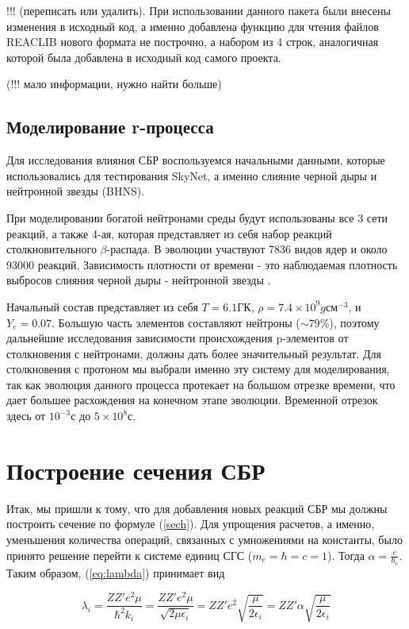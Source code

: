 \documentclass[%
master,    %
natbib,      %
subf,        %
href,        %
colorlinks,  %
]{disser}
\begin{document}
!!! (переписать или удалить). При использовании данного пакета были внесены изменения в исходный код, а именно добавлена функцию для чтения файлов REACLIB нового формата не построчно, а набором из 4 строк, аналогичная которой была добавлена в исходный код самого проекта.

(!!! мало информации, нужно найти больше)

\subsection{Моделирование r-процесса}

Для исследования влияния СБР воспользуемся начальными данными, которые использовались для тестирования SkyNet, а именно слияние черной дыры и нейтронной звезды (BHNS).

При моделировании богатой нейтронами среды будут использованы все 3 сети реакций, а также 4-ая, которая представляет из себя набор реакций столкновительного $\beta$-распада. В эволюции участвуют 7836 видов ядер и около 93000 реакций. Зависимость плотности от времени - это наблюдаемая плотность выбросов слияния черной дыры - нейтронной звезды \cite{bhns}. 

Начальный состав представляет из себя $T = 6.1 \text{ГК}$, $\rho = 7.4 \times 10^9 g \text{см}^{-3}$, и $Y_e = 0.07$. Большую часть элементов составляют нейтроны ($\sim 79 \%$), поэтому дальнейшие исследования зависимости происхождения p-элементов от столкновения с нейтронами, должны дать более значительный результат. Для столкновения с протоном мы выбрали именно эту систему для моделирования, так как эволюция данного процесса протекает на большом отрезке времени, что дает большее расхождения на конечном этапе эволюции. Временной отрезок здесь от $10^{-3}\text{с}$ до $5\times10^8\text{с}$.

\section{Построение сечения СБР}

Итак, мы пришли к тому, что для добавления новых реакций СБР мы должны построить сечение по формуле (\ref{sech}). Для упрощения расчетов, а именно, уменьшения количества операций, связанных с умножениями на константы, было принято решение перейти к системе единиц СГС ($m_e = \hbar = c = 1$). Тогда $\alpha = \frac{e}{\hbar_c}$. Таким образом, (\ref{eq:lambda}) принимает вид

\begin{equation}
\lambda_i = \frac{Z Z' e^2 \mu}{\hbar^2 k_i} = \frac{Z Z' e^2 \mu}{\sqrt{2\mu \epsilon_i}} = Z Z' e^2 \sqrt{\frac{\mu}{2 \epsilon_i}} = Z Z' \alpha \sqrt{\frac{\mu}{2 \epsilon_i}}
\end{equation}
\end{document}
